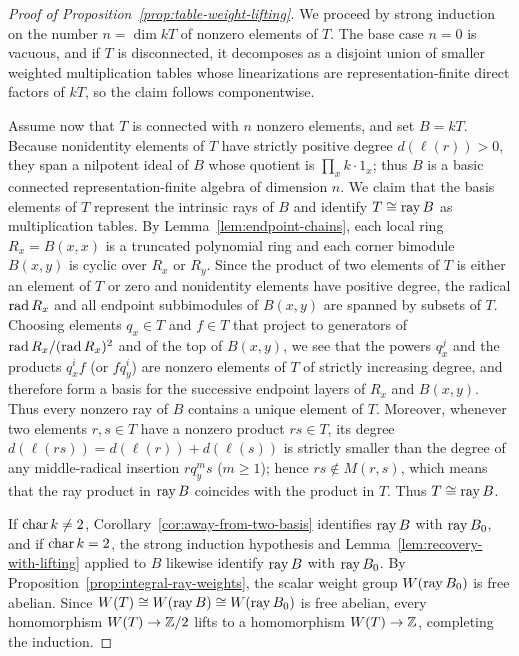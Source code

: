 \begin{proof}[Proof of Proposition~\ref{prop:table-weight-lifting}]
We proceed by strong induction on the number $n=\dim kT$ of nonzero elements of $T$. The base case $n=0$ is vacuous, and if $T$ is disconnected, it decomposes as a disjoint union of smaller weighted multiplication tables whose linearizations are representation-finite direct factors of $kT$, so the claim follows componentwise.

Assume now that $T$ is connected with $n$ nonzero elements, and set $B=kT$. Because nonidentity elements of $T$ have strictly positive degree $d(\ell(r))>0$, they span a nilpotent ideal of $B$ whose quotient is $\prod_x k\cdot 1_x$; thus $B$ is a basic connected representation-finite algebra of dimension $n$. We claim that the basis elements of $T$ represent the intrinsic rays of $B$ and identify $T\cong\operatorname{ray} B$ as multiplication tables. By Lemma~\ref{lem:endpoint-chains}, each local ring $R_x=B(x,x)$ is a truncated polynomial ring and each corner bimodule $B(x,y)$ is cyclic over $R_x$ or $R_y$. Since the product of two elements of $T$ is either an element of $T$ or zero and nonidentity elements have positive degree, the radical $\operatorname{rad} R_x$ and all endpoint subbimodules of $B(x,y)$ are spanned by subsets of $T$. Choosing elements $q_x\in T$ and $f\in T$ that project to generators of $\operatorname{rad} R_x/(\operatorname{rad} R_x)^2$ and of the top of $B(x,y)$, we see that the powers $q_x^j$ and the products $q_x^if$ (or $fq_y^i$) are nonzero elements of $T$ of strictly increasing degree, and therefore form a basis for the successive endpoint layers of $R_x$ and $B(x,y)$. Thus every nonzero ray of $B$ contains a unique element of $T$. Moreover, whenever two elements $r,s\in T$ have a nonzero product $rs\in T$, its degree $d(\ell(rs))=d(\ell(r))+d(\ell(s))$ is strictly smaller than the degree of any middle-radical insertion $rq_y^ms$ ($m\geq1$); hence $rs\notin M(r,s)$, which means that the ray product in $\operatorname{ray} B$ coincides with the product in $T$. Thus $T\cong\operatorname{ray} B$.

If $\operatorname{char} k\ne2$, Corollary~\ref{cor:away-from-two-basis} identifies $\operatorname{ray} B$ with $\operatorname{ray} B_0$, and if $\operatorname{char} k=2$, the strong induction hypothesis and Lemma~\ref{lem:recovery-with-lifting} applied to $B$ likewise identify $\operatorname{ray} B$ with $\operatorname{ray} B_0$. By Proposition~\ref{prop:integral-ray-weights}, the scalar weight group $W(\operatorname{ray} B_0)$ is free abelian. Since $W(T)\cong W(\operatorname{ray} B)\cong W(\operatorname{ray} B_0)$ is free abelian, every homomorphism $W(T)\to\mathbb Z/2$ lifts to a homomorphism $W(T)\to\mathbb Z$, completing the induction.
\end{proof}

